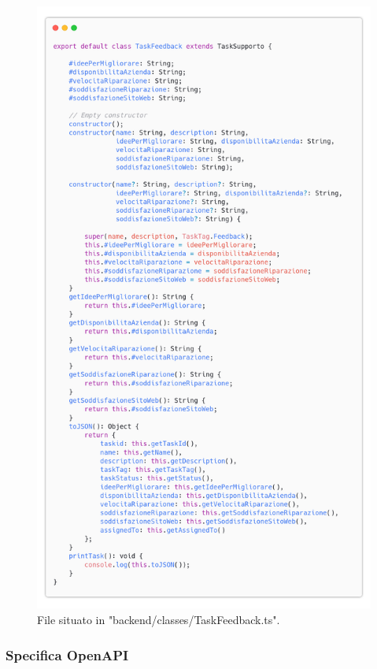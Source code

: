 \documentclass{report}
\begin{document}
\begin{figure}[H]
	\centering\includegraphics[width=1\textwidth]{images/code_task_feedback.png}
	File situato in "backend/classes/TaskFeedback.ts".
\end{figure}

\subsubsection*{Specifica OpenAPI}
\end{document}
